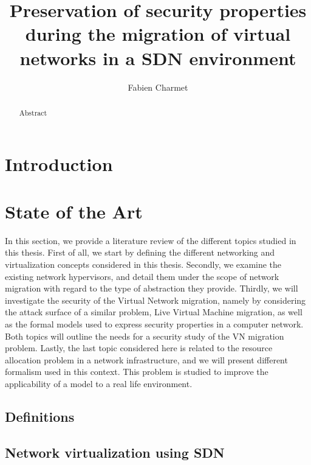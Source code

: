 \documentclass[a4paper, 11pt]{article}
\title{\LARGE \bf Preservation of security properties during the migration of virtual networks in a SDN environment}
\author{Fabien Charmet}
\begin{document}

\maketitle

\begin{abstract}
Abstract
\end{abstract}

\tableofcontents
\listoffigures
 \listoftables
\thispagestyle{empty}


\newpage
{}
\section{Introduction}

 

\newpage
\section{State of the Art}
\label{sec:sota}
In this section, we provide a literature review of the different topics studied in this thesis.
First of all, we start by defining the different networking and virtualization concepts considered in this thesis.
Secondly, we examine the existing network hypervisors, and detail them under the scope of network migration with regard to the type of abstraction they provide.
Thirdly, we will investigate the security of the Virtual Network migration, namely by considering the attack surface of a similar problem, Live Virtual Machine migration, as well as the formal models used to express security properties in a computer network.
Both topics will outline the needs for a security study of the VN migration problem.
Lastly, the last topic considered here is related to the resource allocation problem in a network infrastructure, and we will present different formalism used in this context.
This problem is studied to improve the applicability of a model to a real life environment.

\subsection{Definitions}
\label{sec:basic_def}


\newpage
\subsection{Network virtualization using SDN}
\end{document}

